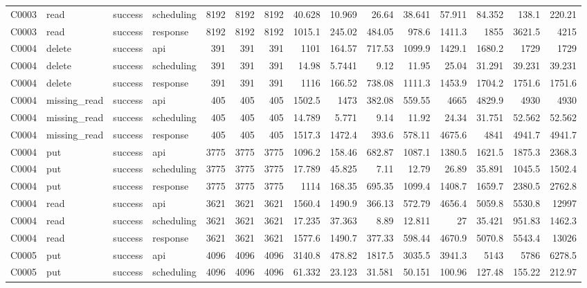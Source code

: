 \begin{landscape}
\begin{longtable}{llllrrrrrrrrrrr}
C0003 & read & success & scheduling & 8192 & 8192 & 8192 & 40.628 & 10.969 & 26.64 & 38.641 & 57.911 & 84.352 & 138.1 & 220.21\\
C0003 & read & success & response & 8192 & 8192 & 8192 & 1015.1 & 245.02 & 484.05 & 978.6 & 1411.3 & 1855 & 3621.5 & 4215\\
C0004 & delete & success & api & 391 & 391 & 391 & 1101 & 164.57 & 717.53 & 1099.9 & 1429.1 & 1680.2 & 1729 & 1729\\
C0004 & delete & success & scheduling & 391 & 391 & 391 & 14.98 & 5.7441 & 9.12 & 11.95 & 25.04 & 31.291 & 39.231 & 39.231\\
C0004 & delete & success & response & 391 & 391 & 391 & 1116 & 166.52 & 738.08 & 1111.3 & 1453.9 & 1704.2 & 1751.6 & 1751.6\\
C0004 & missing\_\allowbreak{}read & success & api & 405 & 405 & 405 & 1502.5 & 1473 & 382.08 & 559.55 & 4665 & 4829.9 & 4930 & 4930\\
C0004 & missing\_\allowbreak{}read & success & scheduling & 405 & 405 & 405 & 14.789 & 5.771 & 9.14 & 11.92 & 24.34 & 31.751 & 52.562 & 52.562\\
C0004 & missing\_\allowbreak{}read & success & response & 405 & 405 & 405 & 1517.3 & 1472.4 & 393.6 & 578.11 & 4675.6 & 4841 & 4941.7 & 4941.7\\
C0004 & put & success & api & 3775 & 3775 & 3775 & 1096.2 & 158.46 & 682.87 & 1087.1 & 1380.5 & 1621.5 & 1875.3 & 2368.3\\
C0004 & put & success & scheduling & 3775 & 3775 & 3775 & 17.789 & 45.825 & 7.11 & 12.79 & 26.89 & 35.891 & 1045.5 & 1502.4\\
C0004 & put & success & response & 3775 & 3775 & 3775 & 1114 & 168.35 & 695.35 & 1099.4 & 1408.7 & 1659.7 & 2380.5 & 2762.8\\
C0004 & read & success & api & 3621 & 3621 & 3621 & 1560.4 & 1490.9 & 366.13 & 572.79 & 4656.4 & 5059.8 & 5530.8 & 12997\\
C0004 & read & success & scheduling & 3621 & 3621 & 3621 & 17.235 & 37.363 & 8.89 & 12.811 & 27 & 35.421 & 951.83 & 1462.3\\
C0004 & read & success & response & 3621 & 3621 & 3621 & 1577.6 & 1490.7 & 377.33 & 598.44 & 4670.9 & 5070.8 & 5543.4 & 13026\\
C0005 & put & success & api & 4096 & 4096 & 4096 & 3140.8 & 478.82 & 1817.5 & 3035.5 & 3941.3 & 5143 & 5786 & 6278.5\\
C0005 & put & success & scheduling & 4096 & 4096 & 4096 & 61.332 & 23.123 & 31.581 & 50.151 & 100.96 & 127.48 & 155.22 & 212.97\\

\end{longtable}
\end{landscape}
